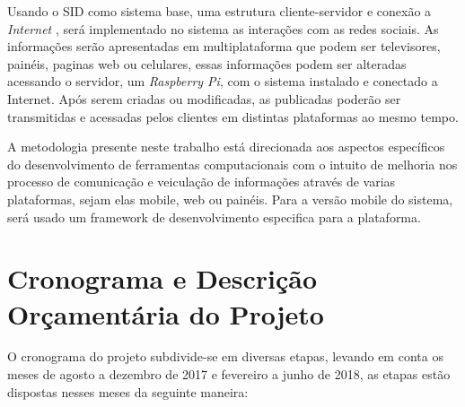 \documentclass[
	12pt,				%
	openright,			%
	oneside,			%
	a4paper,			%
	english,			%
	french,				%
	spanish,			%
	brazil,				%
	]{abntex2}
\begin{document}
	Usando o SID como sistema base, uma estrutura cliente-servidor e conexão a \textit{Internet} , será implementado no sistema as interações com as redes sociais. As informações serão apresentadas em multiplataforma que podem ser televisores, painéis, paginas web ou celulares, essas informações podem ser alteradas acessando o servidor, um \textit{Raspberry Pi}, com o sistema instalado e conectado a Internet. Após serem criadas ou modificadas, as publicadas poderão ser transmitidas e acessadas pelos clientes em distintas plataformas ao mesmo tempo.
	
	A metodologia presente neste trabalho está direcionada aos aspectos específicos	do desenvolvimento de ferramentas computacionais com o intuito de melhoria nos processo de comunicação e veiculação de informações através de varias plataformas, sejam elas mobile, web ou painéis. Para a versão mobile do sistema, será usado um framework de desenvolvimento especifica para a plataforma.
	
\section*{Cronograma e Descrição Orçamentária do Projeto}
	 O cronograma do projeto subdivide-se em diversas etapas, levando em conta os meses de agosto a dezembro de 2017 e fevereiro a junho de 2018, as etapas estão dispostas nesses meses da seguinte maneira:
\end{document}
